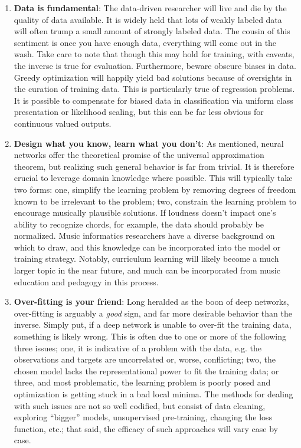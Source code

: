 \begin{enumerate}

\item \textbf{Data is fundamental}:
The data-driven researcher will live and die by the quality of data available.
It is widely held that lots of weakly labeled data will often trump a small amount of strongly labeled data.
The cousin of this sentiment is once you have enough data, everything will come out in the wash.
Take care to note that though this may hold for training, with caveats, the inverse is true for evaluation.
Furthermore, beware obscure biases in data.
Greedy optimization will happily yield bad solutions because of oversights in the curation of training data.
This is particularly true of regression problems.
It is possible to compensate for biased data in classification via uniform class presentation or likelihood scaling, but this can be far less obvious for continuous valued outputs.


\item \textbf{Design what you know, learn what you don't}:
As mentioned, neural networks offer the theoretical promise of the universal approximation theorem, but realizing such general behavior is far from trivial.
It is therefore crucial to leverage domain knowledge where possible.
This will typically take two forms:
one, simplify the learning problem by removing degrees of freedom known to be irrelevant to the problem;
two, constrain the learning problem to encourage musically plausible solutions.
If loudness doesn't impact one's ability to recognize chords, for example, the data should probably be normalized.
Music informatics researchers have a diverse background on which to draw, and this knowledge can be incorporated into the model or training strategy.
Notably, curriculum learning will likely become a much larger topic in the near future, and much can be incorporated from music education and pedagogy in this process.


\item \textbf{Over-fitting is your friend}:
Long heralded as the boon of deep networks, over-fitting is arguably a \emph{good} sign, and far more desirable behavior than the inverse.
Simply put, if a deep network is unable to over-fit the training data, something is likely wrong.
This is often due to one or more of the following three issues;
one, it is indicative of a problem with the data, e.g. the observations and targets are uncorrelated or, worse, conflicting;
two, the chosen model lacks the representational power to fit the training data;
or three, and most problematic, the learning problem is poorly posed and optimization is getting stuck in a bad local minima.
The methods for dealing with such issues are not so well codified, but consist of data cleaning, exploring ``bigger'' models, unsupervised pre-training, changing the loss function, etc.; that said, the efficacy of such approaches will vary case by case.



\end{enumerate}
